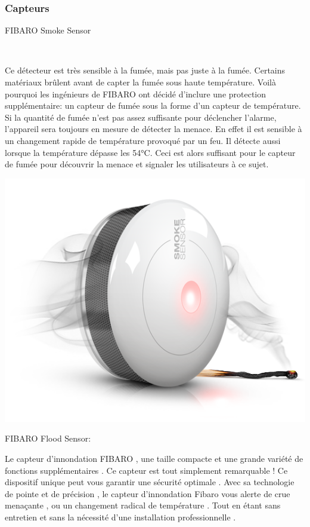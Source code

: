 \subsubsection{Capteurs}

\begin{description}
\item[FIBARO Smoke Sensor] \hfill \\

\end{description}
Ce détecteur est très sensible à la fumée, mais pas juste à la fumée. Certains matériaux brûlent avant de capter la fumée sous haute température.
Voilà pourquoi les ingénieurs de  FIBARO ont décidé d'inclure une protection supplémentaire: un capteur de fumée sous la forme d'un capteur de température.
 Si la quantité de fumée n'est pas assez suffisante pour déclencher l'alarme, l'appareil sera toujours en mesure de détecter la menace.
En effet il est sensible à un changement rapide de température provoqué par un feu. Il détecte aussi lorsque la température dépasse les 54°C. Ceci est alors suffisant pour le capteur de fumée pour découvrir la menace et signaler les utilisateurs à ce sujet. 

\includegraphics[scale=0.5]{./Images/png/smoke.png}\newline


FIBARO Flood Sensor:

Le capteur d'innondation FIBARO , une taille compacte et une grande variété de fonctions supplémentaires . Ce capteur est tout simplement remarquable ! Ce dispositif unique peut vous garantir une sécurité optimale . Avec sa technologie de pointe et de précision , le capteur d'innondation Fibaro vous alerte de crue menaçante , ou un changement radical de température . Tout en étant sans entretien et sans la nécessité d'une installation professionnelle .


